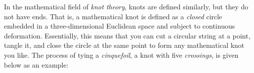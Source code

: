 \begin{center}
\end{center}

In the mathematical field of \textit{knot theory}, knots are defined similarly, but they do not have ends. That is, a mathematical knot is defined as a \textit{closed} circle embedded in a three-dimensional Euclidean space and subject to continuous deformation. Essentially, this means that you can cut a circular string at a point, tangle it, and close the circle at the same point to form any mathematical knot you like. The process of tying a \textit{cinquefoil}, a knot with five \textit{crossings}, is given below as an example: \\[\baselineskip]


